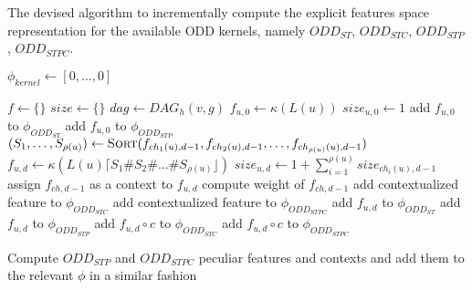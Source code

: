 \begin{algorithm}
    \caption{The devised algorithm to incrementally compute the explicit
    features space representation for the available ODD kernels, namely
    $ODD_{ST}$, $ODD_{STC}$, $ODD_{STP}$, $ODD_{STPC}$.}
    \label{alg:incremental}
    \begin{algorithmic}[1]
            \State $\phi_{kernel} \gets [0,\dots,0]$
        \EndFor

            \State $f \gets \{\}$
            \State $size \gets \{\}$
            \State $dag \gets DAG_h(v, g)$
                        \State $f_{u,0} \gets \kappa(L(u))$
                        \State $size_{u,0} \gets 1$
                        \State add $f_{u,0}$ to $\phi_{ODD_{ST}}$
                        \State add $f_{u,0}$ to $\phi_{ODD_{STP}}$
                    \Else
                        \State $(S_1,\dots,S_{\rho(u)}) \gets \Call{Sort}{
                        f_{ch_1(u),d-1},f_{ch_2(u),d-1},\dots,f_{ch_{\rho(u)}(u),d-1}}$
                        \State $f_{u,d} \gets \kappa(L(u)\lceil{}S_1\#S_2\#\dots\#S_{\rho(u)}\rfloor)$
                        \State $size_{u,d} \gets 1 + \sum_{i=1}^{\rho(u)}size_{ch_i(u),d-1}$
                            \State assign $f_{ch,d-1}$ as a context to $f_{u,d}$
                            \State compute weight of $f_{ch,d-1}$
                            \State add contextualized feature to $\phi_{ODD_{STC}}$
                            \State add contextualized feature to $\phi_{ODD_{STPC}}$
                        \EndFor
                        \State add $f_{u,d}$ to $\phi_{ODD_{ST}}$
                        \State add $f_{u,d}$ to $\phi_{ODD_{STP}}$
                    \EndIf
                        \State add $f_{u,d}\circ{}c$ to $\phi_{ODD_{STC}}$
                        \State add $f_{u,d}\circ{}c$ to $\phi_{ODD_{STPC}}$
                    \EndIf

                    \State Compute $ODD_{STP}$ and $ODD_{STPC}$ peculiar features
                    and contexts and add them to the relevant $\phi$ in a similar
                    fashion\label{line:stp}
                \EndFor
            \EndFor
        \EndFor
    \end{algorithmic}
\end{algorithm}

